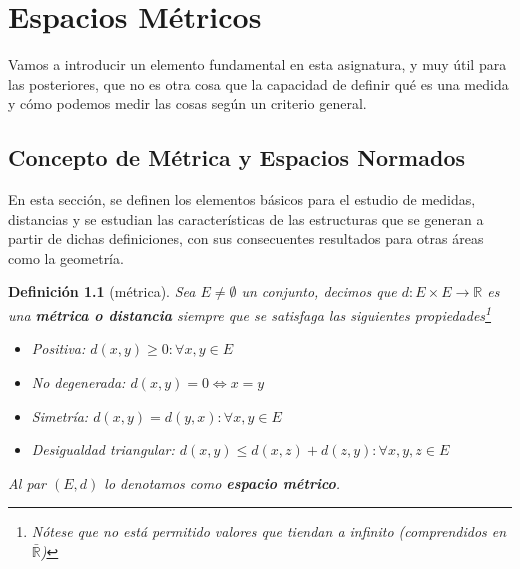 \documentclass[10pt,a4paper,openright]{book}
\theoremstyle{break}
\newtheorem*{defi}{Definición}
\begin{document}
\mainmatter
\hypersetup{linkcolor=black} %
\setcounter{tocdepth}{3}%
\setcounter{secnumdepth}{4}%
\tableofcontents
\hypersetup{linkcolor=blue} %

\chapter{Espacios Métricos}
Vamos a introducir un elemento fundamental en esta asignatura, y muy útil para las posteriores, que no es otra cosa que la capacidad de definir qué es una medida y cómo podemos medir las cosas según un criterio general.

\section{Concepto de Métrica y Espacios Normados}
En esta sección, se definen los elementos básicos para el estudio de medidas, distancias y se estudian las características de las estructuras que se generan a partir de dichas definiciones, con sus consecuentes resultados para otras áreas como la geometría.

\begin{defi}[métrica]
Sea $E\neq \emptyset$ un conjunto, decimos que $d: E\times E \rightarrow \mathbb R$ es una \textbf{métrica o distancia} siempre que se satisfaga las siguientes propiedades\footnote{Nótese que no está permitido valores que tiendan a infinito (comprendidos en $\bar{\mathbb R}$)}
\begin{itemize}
\item Positiva: $d(x,y)\geq 0: \forall x, y \in E$
\item No degenerada: $d(x,y) = 0 \Leftrightarrow x = y$
\item Simetría: $d(x,y) = d(y,x): \forall x,y \in E$
\item Desigualdad triangular: $d(x,y)\leq d(x,z)+ d(z,y): \forall x,y,z\in E$
\end{itemize}

Al par $(E,d)$ lo denotamos como \textbf{espacio métrico}.

\end{defi}
\end{document}
